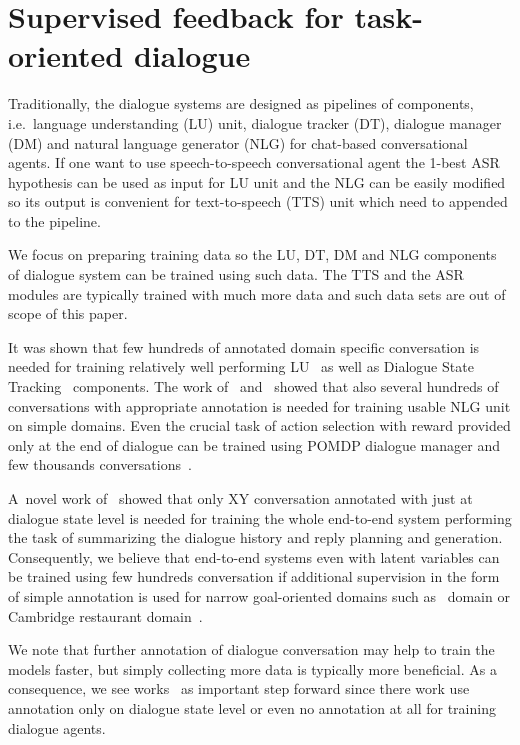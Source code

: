 \documentclass[runningheads,a4paper]{llncs}
\begin{document}

\section{Supervised feedback for task-oriented dialogue}
\label{sec:repre}
Traditionally, the dialogue systems are designed as pipelines of components, i.e.\ language understanding (LU) unit, dialogue tracker (DT), dialogue manager (DM) and natural language generator (NLG) for chat-based conversational agents.
If one want to use speech-to-speech conversational agent the 1-best ASR hypothesis can be used as input for LU unit and the NLG can be easily modified so its output is convenient for text-to-speech (TTS) unit which need to appended to the pipeline.

We focus on preparing training data so the LU, DT, DM and NLG components of dialogue system can be trained using such data.
The TTS and the ASR modules are typically trained with much more data and such data sets are out of scope of this paper.

It was shown that few hundreds of annotated domain specific conversation is needed for training relatively well performing LU~\cite{duvsek2014alex} as well as Dialogue State Tracking~\cite{young2010hidden} components.
The work of~\cite{duvsek2014alex} and~\cite{mairesse2010phrase} showed that also several hundreds of conversations with appropriate annotation is needed for training usable NLG unit on simple domains.
Even the crucial task of action selection with reward provided only at the end of dialogue can be trained using POMDP dialogue manager and few thousands conversations~\cite{gasic2011line}.

A~novel work of~\cite{wen2016network} showed that only XY conversation annotated with just at dialogue state level is needed for training the whole end-to-end system performing the task of summarizing the dialogue history and reply planning and generation.
Consequently, we believe that end-to-end systems even with latent variables can be trained using few hundreds conversation if additional supervision in the form of simple annotation is used for narrow goal-oriented domains such as~\cite{wen2016network} domain or Cambridge restaurant domain~\cite{henderson2014dstc2}.

We note that further annotation of dialogue conversation may help to train the models faster, but simply collecting more data is typically more beneficial.
As a consequence, we see works~\cite{wen2016network,bordes2016learning,williams2016end} as important step forward since there work use annotation only on dialogue state level or even no annotation at all for training dialogue agents.
\end{document}
